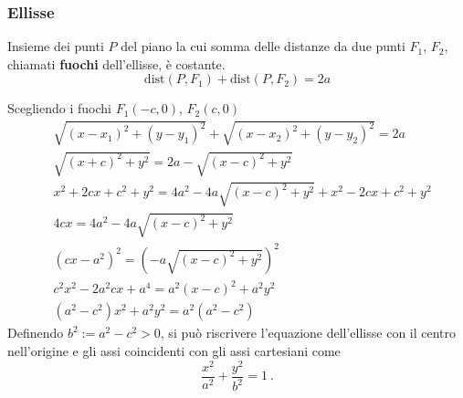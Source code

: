 \subsubsection{Ellisse}
\begin{definition}[Ellisse] Insieme dei punti $P$ del piano la cui somma delle distanze da due punti $F_1$, $F_2$, chiamati \textbf{fuochi} dell'ellisse, è costante.
    \begin{equation}
        \text{dist}(P, F_1) + \text{dist}(P, F_2) = 2a
    \end{equation}
\end{definition}
Scegliendo i fuochi $F_1(-c,0)$, $F_2(c,0)$
\begin{equation}
\begin{aligned}
    & \sqrt{( x - x_1 )^2 + (y-y_1)^2} + \sqrt{(x-x_2)^2 + (y-y_2)^2} = 2a \\
    & \sqrt{( x + c )^2 + y^2} = 2a - \sqrt{(x-c)^2 + y^2} \\
    & x^2 + 2 c x + c^2 + y^2  = 4a^2 - 4 a \sqrt{(x-c)^2 + y^2} +
    x^2 - 2 c x + c^2 + y^2 \\
    & 4c x = 4a^2 - 4a  \sqrt{(x-c)^2 + y^2} \\
    & (cx - a^2)^2 = ( - a  \sqrt{(x-c)^2 + y^2})^2 \\
    & c^2x^2 - 2a^2cx + a^4 = a^2(x-c)^2 + a^2 y^2 \\
    & (a^2-c^2) x^2 + a^2y^2 = a^2 (a^2-c^2) 
\end{aligned}
\end{equation}
Definendo $b^2 := a^2 - c^2 > 0$, si può riscrivere l'equazione dell'ellisse con il centro nell'origine e gli assi coincidenti con gli assi cartesiani come
\begin{equation}
  \dfrac{x^2}{a^2} + \dfrac{y^2}{b^2} = 1 \ .
\end{equation}


